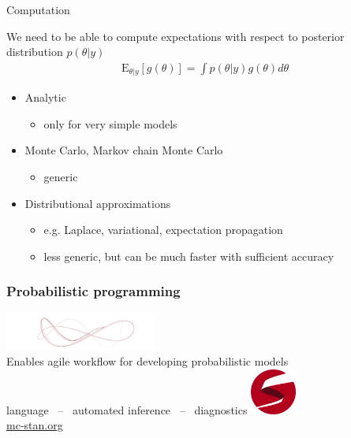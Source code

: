 \documentclass[english,t]{beamer}
\newcommand{\E}{\mathrm{E}}
\begin{document}
\begin{frame}{Computation}

  We need to be able to compute expectations with respect to posterior
  distribution $p(\theta|y)$
  \begin{align*}
    \E_{\theta|y}\left[ g(\theta) \right] = \int p(\theta|y)g(\theta) d\theta
  \end{align*}
  
  \begin{itemize}
  \item Analytic
    \begin{itemize}
    \item only for very simple models
    \end{itemize}
  \item Monte Carlo, Markov chain Monte Carlo
    \begin{itemize}
    \item generic
    \end{itemize}
  \item Distributional approximations
    \begin{itemize}
    \item e.g. Laplace, variational, expectation propagation
    \item less generic, but can be much faster with sufficient accuracy
    \end{itemize}
  \end{itemize}
\end{frame}

\begin{frame}
  
  \frametitle{Probabilistic programming}
  
  \begin{center}
   \vspace{-\baselineskip}
    \includegraphics[width=5cm]{wide_ensemble.png}\\
   \vspace{2\baselineskip}
  {\large Enables agile workflow for developing probabilistic models}\\
   \vspace{\baselineskip}
   language \, -- \,
   automated inference \, -- \,
   diagnostics
   \vspace{\baselineskip}
  \vfill
    \includegraphics[width=1.5cm]{stan_logo_wide.png}\\
    \url{mc-stan.org}
  \end{center}

\end{frame}
\end{document}
